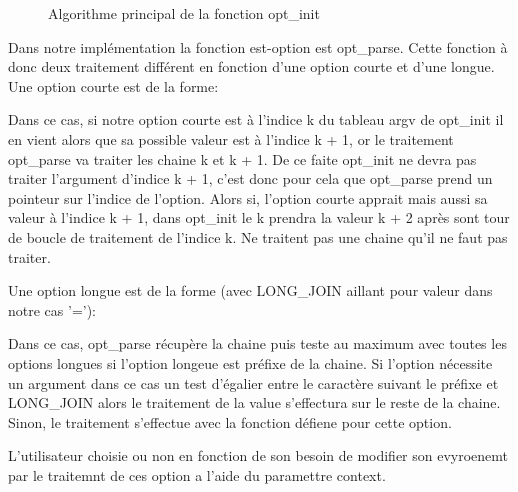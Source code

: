\documentclass[12pt]{article}
\renewcommand{\algorithmicwhile}{\textbf{Tant que}}
\begin{document}
        \begin{figure}[ht]
            \renewcommand{\algorithmicwhile}{\textbf{Pour chaque}}
            \begin{algorithmic}
                    \ELSE{}
                    \ENDIF{}
                \ENDWHILE{}
            \end{algorithmic}
            \caption{Algorithme principal de la fonction opt\_init}
        \end{figure}

        Dans notre implémentation la fonction est-option est opt\_parse. 
        Cette fonction à donc deux traitement différent en fonction d'une 
        option courte et d'une longue. Une option courte est de la forme:


        Dans ce cas, si notre option courte est à l'indice k du tableau argv de 
        opt\_init il en vient alors que sa possible valeur est à l'indice k + 1, 
        or le traitement opt\_parse va traiter les chaine k et k + 1. De ce 
        faite opt\_init ne devra pas traiter l'argument d'indice k + 1, c'est 
        donc pour cela que opt\_parse prend un pointeur sur l'indice de 
        l'option. Alors si, l'option courte apprait mais aussi sa valeur à 
        l'indice k + 1, dans opt\_init le k prendra la valeur k + 2 après sont 
        tour de boucle de traitement de l'indice k. Ne traitent pas une chaine 
        qu'il ne faut pas traiter.

        Une option longue est de la forme (avec LONG\_JOIN aillant pour valeur 
        dans notre cas '='):


        Dans ce cas,  opt\_parse récupère la chaine puis teste au maximum avec 
        toutes les options longues si l'option longeue est préfixe de la chaine. 
        Si l'option nécessite un argument dans ce cas un test d'égalier entre 
        le caractère suivant le préfixe et LONG\_JOIN alors le traitement de la 
        value s'effectura sur le reste de la chaine.   
        Sinon, le traitement s'effectue avec la fonction défiene pour cette 
        option.

        L'utilisateur choisie ou non en fonction de son besoin de modifier son 
        evyroenemt par le traitemnt de ces option a l'aide du paramettre 
        context.
\end{document}
